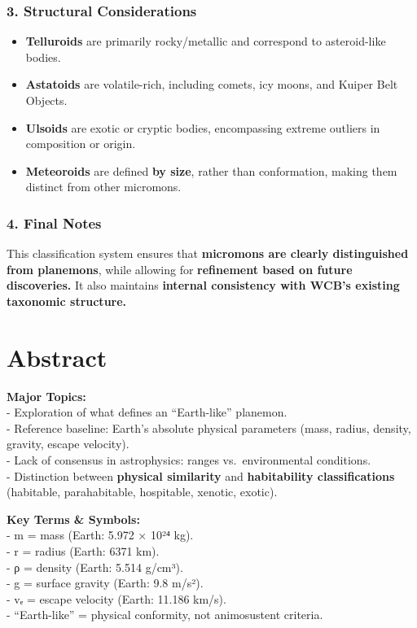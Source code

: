 \documentclass[
  letterpaper,
]{book}
\providecommand{\tightlist}{%
  \setlength{\itemsep}{0pt}\setlength{\parskip}{0pt}}
\begin{document}
\subsection{\texorpdfstring{\textbf{3. Structural
Considerations}}{3. Structural Considerations}}\label{structural-considerations}

\begin{itemize}
\tightlist
\item
  \textbf{Telluroids} are primarily rocky/metallic and correspond to
  asteroid-like bodies.
\item
  \textbf{Astatoids} are volatile-rich, including comets, icy moons, and
  Kuiper Belt Objects.
\item
  \textbf{Ulsoids} are exotic or cryptic bodies, encompassing extreme
  outliers in composition or origin.
\item
  \textbf{Meteoroids} are defined \textbf{by size}, rather than
  conformation, making them distinct from other micromons.
\end{itemize}

\subsection{\texorpdfstring{\textbf{4. Final
Notes}}{4. Final Notes}}\label{final-notes}

This classification system ensures that \textbf{micromons are clearly
distinguished from planemons}, while allowing for \textbf{refinement
based on future discoveries.} It also maintains \textbf{internal
consistency with WCB's existing taxonomic structure.}

\chapter{Abstract}\label{abstract-20}

\textbf{Major Topics:}\\
- Exploration of what defines an ``Earth-like'' planemon.\\
- Reference baseline: Earth's absolute physical parameters (mass,
radius, density, gravity, escape velocity).\\
- Lack of consensus in astrophysics: ranges vs.~environmental
conditions.\\
- Distinction between \textbf{physical similarity} and
\textbf{habitability classifications} (habitable, parahabitable,
hospitable, xenotic, exotic).

\textbf{Key Terms \& Symbols:}\\
- m = mass (Earth: 5.972 × 10²⁴ kg).\\
- r = radius (Earth: 6371 km).\\
- ρ = density (Earth: 5.514 g/cm³).\\
- g = surface gravity (Earth: 9.8 m/s²).\\
- vₑ = escape velocity (Earth: 11.186 km/s).\\
- ``Earth-like'' = physical conformity, not animosustent criteria.
\end{document}
